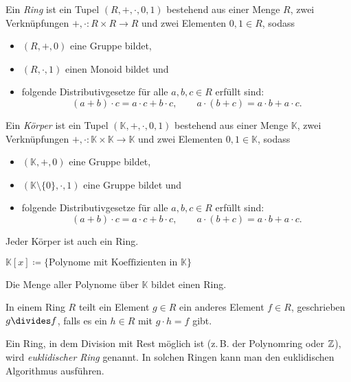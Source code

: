 \documentclass{cheat-sheet}
\newcommand{\K}{\mathbb{K}} %
\begin{document}
\begin{defn}
  Ein \emph{Ring} ist ein Tupel $(R, +, \cdot, 0, 1)$ bestehend aus einer Menge $R$, zwei Verknüpfungen $+, \cdot : R \times R \to R$ und zwei Elementen $0, 1 \in R$, sodass
  \begin{itemize}
    \item $(R, +, 0)$ eine Gruppe bildet,
    \item $(R, \cdot, 1)$ einen Monoid bildet und
    \item folgende Distributivgesetze für alle $a, b, c \in R$ erfüllt sind:
    \[
      (a + b) \cdot c = a \cdot c + b \cdot c, \qquad
      a \cdot (b + c) = a \cdot b + a \cdot c.
    \]
  \end{itemize}
\end{defn}

\begin{defn}
  Ein \emph{Körper} ist ein Tupel $(\K, +, \cdot, 0, 1)$ bestehend aus einer Menge $\K$, zwei Verknüpfungen $+, \cdot : \K \times \K \to \K$ und zwei Elementen $0, 1 \in \K$, sodass
  \begin{itemize}
    \item $(\K, +, 0)$ eine Gruppe bildet,
    \item $(\K \setminus \{ 0 \}, \cdot, 1)$ eine Gruppe bildet und
    \item folgende Distributivgesetze für alle $a, b, c \in R$ erfüllt sind:
    \[
      (a + b) \cdot c = a \cdot c + b \cdot c, \qquad
      a \cdot (b + c) = a \cdot b + a \cdot c.
    \]
  \end{itemize}
\end{defn}

\begin{bem}
  Jeder Körper ist auch ein Ring.
\end{bem}

\begin{nota}
  $\K[x] \coloneqq \{ \text{Polynome mit Koeffizienten in $\K$} \}$
\end{nota}

\begin{bem}
  Die Menge aller Polynome über $\K$ bildet einen Ring.
\end{bem}

\begin{defn}
  In einem Ring $R$ teilt ein Element $g \in R$ ein anderes Element $f \in R$, geschrieben $g \divides f$, falls es ein $h \in R$ mit $g \cdot h = f$ gibt.
\end{defn}

\begin{bem}
  Ein Ring, in dem Division mit Rest möglich ist (z.\,B. der Polynomring oder $\mathbb{Z}$), wird \emph{euklidischer Ring} genannt. In solchen Ringen kann man den euklidischen Algorithmus ausführen.
\end{bem}
\end{document}
